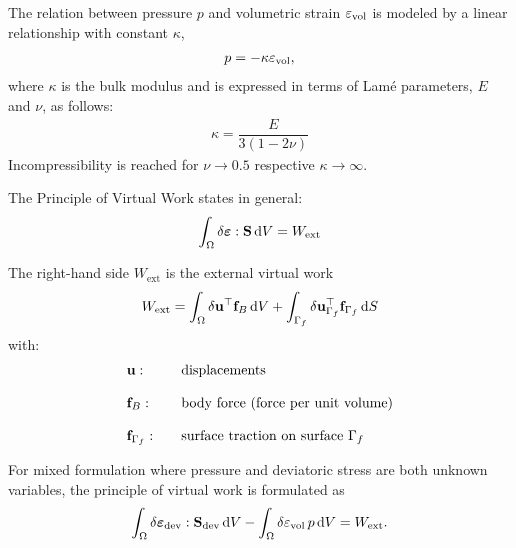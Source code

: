 The relation between pressure $p$ and volumetric strain $\varepsilon_\text{vol}$ is modeled by a linear relationship with constant $\kappa$,
\begin{equation*}
  \begin{array}{lll}
    p = -\kappa \varepsilon_\text{vol},
  \end{array}
\end{equation*}
where $\kappa$ is the bulk modulus and is expressed in terms of Lamé parameters, $E$ and $\nu$, as follows:
\begin{equation*}
  \begin{array}{lll}
    \kappa = \dfrac{E}{3(1-2ν)}
  \end{array}
\end{equation*}
Incompressibility is reached for $\nu \to 0.5$ respective $\kappa\to\infty$.


The Principle of Virtual Work states in general:
\begin{equation*}
  \begin{array}{lll}
    \ds\int_{\Omega} \delta\bfeps : \bfS\,\d V = W_\text{ext}
  \end{array}
\end{equation*}

The right-hand side $W_\text{ext}$ is the external virtual work
\begin{equation*}
  \begin{array}{lll}
    W_\text{ext} = \ds\int_{\Omega} \delta \bfu^\top \bff_B\,\d V + \ds\int_{\Gamma_f} \delta \bfu_{\Gamma_f}^{\top} \bff_{\Gamma_f}\,\d S
  \end{array}
\end{equation*}
with:
\begin{equation*}
  \begin{array}{lll}
    \textbf{u}: \quad & \text{displacements}\\[4mm]
    \textbf{f}_B: \quad & \text{body force (force per unit volume)}\\[4mm]    
    \textbf{f}_{\Gamma_f}: \quad &\text{surface traction on surface $\Gamma_f$}
  \end{array}
\end{equation*}

For mixed formulation where pressure and deviatoric stress are both unknown variables, the principle of virtual work is formulated as
\begin{equation}\label{eq:mixed_eq1}
  \begin{array}{lll}
    \ds\int_{\Omega} \delta \bfeps_\text{dev} : \bfS_\text{dev} \,\d V - \ds\int_{\Omega} \delta \eps_\text{vol}\,p \,\d V = W_\text{ext}.
  \end{array}
\end{equation}

